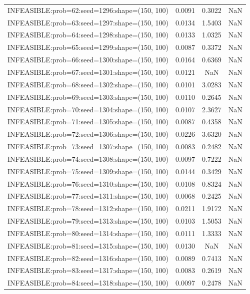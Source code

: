 \begin{longtable}{lccc}
INFEASIBLE:prob=62:seed=1296:shape=(150, 100)  & 0.0091 &  0.3022 &    NaN \\
INFEASIBLE:prob=63:seed=1297:shape=(150, 100)  & 0.0134 &  1.5403 &    NaN \\
INFEASIBLE:prob=64:seed=1298:shape=(150, 100)  & 0.0133 &  1.0325 &    NaN \\
INFEASIBLE:prob=65:seed=1299:shape=(150, 100)  & 0.0087 &  0.3372 &    NaN \\
INFEASIBLE:prob=66:seed=1300:shape=(150, 100)  & 0.0164 &  0.6369 &    NaN \\
INFEASIBLE:prob=67:seed=1301:shape=(150, 100)  & 0.0121 &     NaN &    NaN \\
INFEASIBLE:prob=68:seed=1302:shape=(150, 100)  & 0.0101 &  3.0283 &    NaN \\
INFEASIBLE:prob=69:seed=1303:shape=(150, 100)  & 0.0110 &  0.2645 &    NaN \\
INFEASIBLE:prob=70:seed=1304:shape=(150, 100)  & 0.0107 &  2.3627 &    NaN \\
INFEASIBLE:prob=71:seed=1305:shape=(150, 100)  & 0.0087 &  0.4358 &    NaN \\
INFEASIBLE:prob=72:seed=1306:shape=(150, 100)  & 0.0226 &  3.6320 &    NaN \\
INFEASIBLE:prob=73:seed=1307:shape=(150, 100)  & 0.0083 &  0.2482 &    NaN \\
INFEASIBLE:prob=74:seed=1308:shape=(150, 100)  & 0.0097 &  0.7222 &    NaN \\
INFEASIBLE:prob=75:seed=1309:shape=(150, 100)  & 0.0144 &  0.3429 &    NaN \\
INFEASIBLE:prob=76:seed=1310:shape=(150, 100)  & 0.0108 &  0.8324 &    NaN \\
INFEASIBLE:prob=77:seed=1311:shape=(150, 100)  & 0.0068 &  0.2425 &    NaN \\
INFEASIBLE:prob=78:seed=1312:shape=(150, 100)  & 0.0211 &  1.9172 &    NaN \\
INFEASIBLE:prob=79:seed=1313:shape=(150, 100)  & 0.0103 &  1.5053 &    NaN \\
INFEASIBLE:prob=80:seed=1314:shape=(150, 100)  & 0.0111 &  1.3333 &    NaN \\
INFEASIBLE:prob=81:seed=1315:shape=(150, 100)  & 0.0130 &     NaN &    NaN \\
INFEASIBLE:prob=82:seed=1316:shape=(150, 100)  & 0.0089 &  0.7413 &    NaN \\
INFEASIBLE:prob=83:seed=1317:shape=(150, 100)  & 0.0083 &  0.2619 &    NaN \\
INFEASIBLE:prob=84:seed=1318:shape=(150, 100)  & 0.0097 &  0.2478 &    NaN \\

\end{longtable}
